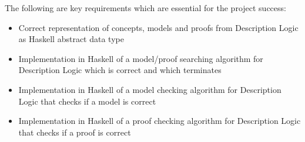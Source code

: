 The following are key requirements which are essential for the project success:

\begin{itemize}
\item Correct representation of concepts, models and proofs from Description Logic as Haskell abstract data type
\item Implementation in Haskell of a model/proof searching algorithm for Description Logic which is correct and which terminates
\item Implementation in Haskell of a model checking algorithm for Description Logic that checks
if a model is correct
\item Implementation in Haskell of a proof checking algorithm for Description Logic that checks if a proof is correct
\end{itemize}


